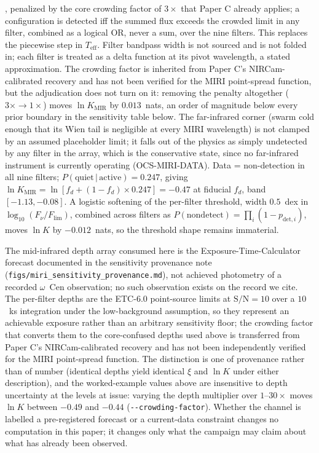 \documentclass[11pt]{article}
\newcommand{\ocen}{\ensuremath{\omega}~Cen}
\newcommand{\lnK}{\ensuremath{\ln K}}
\begin{document}
\citep{JDoxMIRI}, penalized by the core crowding factor of $3\times$ that Paper C already applies; a configuration is detected iff the summed flux exceeds the crowded limit in any filter, combined as a logical OR, never a sum, over the nine filters. This replaces the piecewise step in $T_{\mathrm{eff}}$. Filter bandpass width is not sourced and is not folded in; each filter is treated as a delta function at its pivot wavelength, a stated approximation. The crowding factor is inherited from Paper C's NIRCam-calibrated recovery and has not been verified for the MIRI point-spread function, but the adjudication does not turn on it: removing the penalty altogether ($3\times \to 1\times$) moves $\lnK_{\mathrm{MIR}}$ by $0.013$~nats, an order of magnitude below every prior boundary in the sensitivity table below. The far-infrared corner (swarm cold enough that its Wien tail is negligible at every MIRI wavelength) is not clamped by an assumed placeholder limit; it falls out of the physics as simply undetected by any filter in the array, which is the conservative state, since no far-infrared instrument is currently operating (OCS-MIRI-DATA). Data = non-detection in all nine filters; $P(\mathrm{quiet}\,|\,\mathrm{active}) = 0.247$, giving $\lnK_{\mathrm{MIR}} = \ln[f_{d} + (1-f_{d})\times0.247] = -0.47$ at fiducial $f_{d}$, band $[-1.13, -0.08]$. A logistic softening of the per-filter threshold, width $0.5$~dex in $\log_{10}(F_{\nu}/F_{\mathrm{lim}})$, combined across filters as $P(\mathrm{nondetect}) = \prod_{i}(1-p_{\mathrm{det},i})$, moves $\lnK$ by $-0.012$~nats, so the threshold shape remains immaterial.

The mid-infrared depth array consumed here is the Exposure-Time-Calculator forecast documented in the sensitivity provenance note (\texttt{figs/miri\_sensitivity\_provenance.md}), not achieved photometry of a recorded \ocen{} observation; no such observation exists on the record we cite. The per-filter depths are the ETC-6.0 point-source limits at $\mathrm{S/N} = 10$ over a $10$~ks integration under the low-background assumption, so they represent an achievable exposure rather than an arbitrary sensitivity floor; the crowding factor that converts them to the core-confused depths used above is transferred from Paper C's NIRCam-calibrated recovery and has not been independently verified for the MIRI point-spread function. The distinction is one of provenance rather than of number (identical depths yield identical $\xi$ and $\lnK$ under either description), and the worked-example values above are insensitive to depth uncertainty at the levels at issue: varying the depth multiplier over $1$--$30\times$ moves $\lnK$ between $-0.49$ and $-0.44$ (\texttt{-{}-crowding-factor}). Whether the channel is labelled a pre-registered forecast or a current-data constraint changes no computation in this paper; it changes only what the campaign may claim about what has already been observed.
\end{document}
